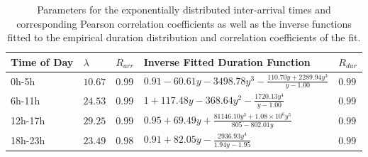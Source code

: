 \begin{table}[htbp]
  \caption{Parameters for the exponentially distributed inter-arrival times and corresponding Pearson correlation coefficients as well as the inverse functions fitted to the empirical duration distribution and correlation coefficients of the fit.}
  \label{tab:fits}
  \tabcolsep=0.11cm
  \centering
  \begin{tabu}{X[2,l]X[r]X[r]X[4.5,r]X[r]} 
  \toprule
  Time of Day & $\lambda$ & $R_{arr}$ & Inverse Fitted Duration Function & $R_{dur}$\\%
  \midrule
  0h-5h & $10.67$ & $0.99$ & $0.91 - 60.61y - 3498.78y^3 - \frac{110.70y + 2289.94y^3}{y - 1.00}$ &  $0.99$ \\
  6h-11h & $24.53$ & $0.99$ & $1 + 117.48y - 368.64y^2 - \frac{1720.13y^4}{y - 1.00}$ & $0.99$ \\
  12h-17h & $29.25$ & $0.99$ & $0.95 + 69.49y + \frac{81146.10y^3 + 1.08\times10^6y^5}{805 - 802.01y}$ & $0.99$ \\
  18h-23h & $23.49$ & $0.98$ & $0.91 + 82.05y - \frac{2936.93y^4}{1.94y - 1.95}$ & $0.99$ \everyrow{} \\ \bottomrule
  \end{tabu}
\end{table}
